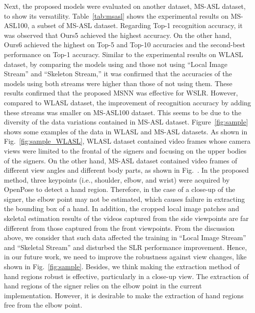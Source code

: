 \documentclass[journal]{IEEEtran}
\begin{document}
Next, the proposed models were evaluated on another dataset, MS-ASL dataset, to show its versatility.
Table~\ref{tab:msasl} shows the experimental results on MS-ASL100, a subset of MS-ASL dataset.
Regarding Top-1 recognition accuracy, it was observed that Ours5 achieved the highest accuracy.
On the other hand, Ours6 achieved the highest on Top-5 and Top-10 accuracies and the second-best performance on Top-1 accuracy. 
Similar to the experimental results on WLASL dataset, by comparing the models using and those not using ``Local Image Stream'' and ``Skeleton Stream,'' it was confirmed that the accuracies of the models using both streams were higher than those of not using them.
These results confirmed that the proposed MSNN was effective for WSLR.
However, compared to WLASL dataset, the improvement of recognition accuracy by adding these streams was smaller on MS-ASL100 dataset.
This seems to be due to the diversity of the data variations contained in MS-ASL dataset.
Figure~\ref{fig:sample} shows some examples of the data in WLASL and MS-ASL datasets.
As shown in Fig.~\ref{fig:sample_WLASL}, WLASL dataset contained video frames whose camera views were limited to the frontal of the signers and focusing on the upper bodies of the signers.
On the other hand, MS-ASL dataset contained video frames of different view angles and different body parts, as shown in Fig.~.
In the proposed method, three keypoints (i.e., shoulder, elbow, and wrist) were acquired by OpenPose to detect a hand region.
Therefore, in the case of a close-up of the signer, the elbow point may not be estimated, which causes failure in extracting the bounding box of a hand.
In addition, the cropped local image patches and skeletal estimation results of the videos captured from the side viewpoints are far different from those captured from the front viewpoints.
From the discussion above, we consider that such data affected the training in ``Local Image Stream'' and ``Skeletal Stream'' and disturbed the SLR performance improvement.
Hence, in our future work, we need to improve the robustness against view changes, like shown in Fig.~\ref{fig:sample}.
Besides, we think making the extraction method of hand regions robust is effective, particularly in a close-up view.
The extraction of hand regions of the signer relies on the elbow point in the current implementation.
However, it is desirable to make the extraction of hand regions free from the elbow point.
\end{document}
